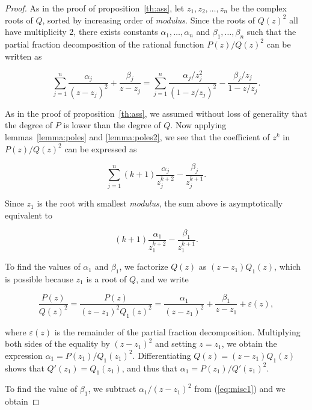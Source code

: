 \documentclass{article}
\begin{document}
\begin{proof}
As in the proof of proposition~\ref{th:ass}, let $z_1, z_2, \ldots, z_n$
be the complex roots of $Q$, sorted by increasing order of
\textit{modulus}. Since the roots of $Q(z)^2$ all have multiplicity 2,
there exists constants $\alpha_1, \ldots, \alpha_n$ and $\beta_1, \ldots,
\beta_n$ such that the partial fraction decomposition of the rational
function $P(z)/Q(z)^2$ can be written as

\begin{equation*}
\sum_{j=1}^n \frac{\alpha_j}{(z-z_j)^2} + \frac{\beta_j}{z-z_j} =
\sum_{j=1}^n \frac{\alpha_j/z_j^2}{(1-z/z_j)^2}
-\frac{\beta_j/z_j}{1-z/z_j}.
\end{equation*}

As in the proof of proposition~\ref{th:ass}, we assumed without loss of
generality that the degree of $P$ is lower than the degree of $Q$. Now
applying lemmas~\ref{lemma:poles} and \ref{lemma:poles2}, we see that
the coefficient of $z^k$ in $P(z)/Q(z)^2$ can be expressed as

\begin{equation}
\label{eq:fullass2}
\sum_{j=1}^n (k+1)\frac{\alpha_j}{z_j^{k+2}}-\frac{\beta_j}{z_j^{k+1}}.
\end{equation}

Since $z_1$ is the root with smallest \textit{modulus}, the sum above is
asymptotically equivalent to

\begin{equation*}
(k+1)\frac{\alpha_1}{z_1^{k+2}}-\frac{\beta_1}{z_1^{k+1}}.
\end{equation*}

To find the values of $\alpha_1$ and $\beta_1$, we factorize $Q(z)$ as
$(z-z_1)Q_1(z)$, which is possible because $z_1$ is a root of $Q$,
and we write

\begin{equation}
\label{eq:misc1}
\frac{P(z)}{Q(z)^2} =
\frac{P(z)}{(z-z_1)^2Q_1(z)^2} = \frac{\alpha_1}{(z-z_1)^2} +
\frac{\beta_1}{z-z_1} + \varepsilon(z),
\end{equation}

\noindent
where $\varepsilon(z)$ is the remainder of the partial fraction
decomposition. Multiplying both sides of the equality by $(z-z_1)^2$ and
setting $z = z_1$, we obtain the expression $\alpha_1 =
P(z_1)/Q_1(z_1)^2$.  Differentiating $Q(z) = (z-z_1)Q_1(z)$ shows that
$Q'(z_1) = Q_1(z_1)$, and thus that $\alpha_1 = P(z_1) / Q'(z_1)^2$.

To find the value of $\beta_1$, we subtract $\alpha_1/(z-z_1)^2$ from
(\ref{eq:misc1}) and we obtain


\end{proof}
\end{document}
